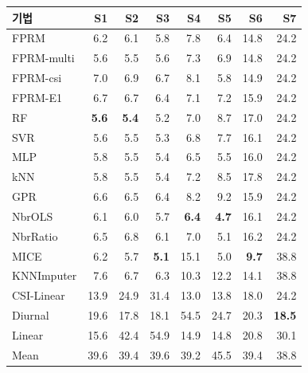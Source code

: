 \begin{tabular}{lrrrrrrr}
\toprule
기법 & S1 & S2 & S3 & S4 & S5 & S6 & S7 \\
\midrule
FPRM & 6.2 & 6.1 & 5.8 & 7.8 & 6.4 & 14.8 & 24.2 \\
FPRM-multi & 5.6 & 5.5 & 5.6 & 7.3 & 6.9 & 14.8 & 24.2 \\
FPRM-csi & 7.0 & 6.9 & 6.7 & 8.1 & 5.8 & 14.9 & 24.2 \\
FPRM-E1 & 6.7 & 6.7 & 6.4 & 7.1 & 7.2 & 15.9 & 24.2 \\
\midrule
RF & \textbf{5.6} & \textbf{5.4} & 5.2 & 7.0 & 8.7 & 17.0 & 24.2 \\
SVR & 5.6 & 5.5 & 5.3 & 6.8 & 7.7 & 16.1 & 24.2 \\
MLP & 5.8 & 5.5 & 5.4 & 6.5 & 5.5 & 16.0 & 24.2 \\
kNN & 5.8 & 5.5 & 5.4 & 7.2 & 8.5 & 17.8 & 24.2 \\
GPR & 6.6 & 6.5 & 6.4 & 8.2 & 9.2 & 15.9 & 24.2 \\
\midrule
NbrOLS & 6.1 & 6.0 & 5.7 & \textbf{6.4} & \textbf{4.7} & 16.1 & 24.2 \\
NbrRatio & 6.5 & 6.8 & 6.1 & 7.0 & 5.1 & 16.2 & 24.2 \\
MICE & 6.2 & 5.7 & \textbf{5.1} & 15.1 & 5.0 & \textbf{9.7} & 38.8 \\
KNNImputer & 7.6 & 6.7 & 6.3 & 10.3 & 12.2 & 14.1 & 38.8 \\
\midrule
CSI-Linear & 13.9 & 24.9 & 31.4 & 13.0 & 13.8 & 18.0 & 24.2 \\
Diurnal & 19.6 & 17.8 & 18.1 & 54.5 & 24.7 & 20.3 & \textbf{18.5} \\
Linear & 15.6 & 42.4 & 54.9 & 14.9 & 14.8 & 20.8 & 30.1 \\
Mean & 39.6 & 39.4 & 39.6 & 39.2 & 45.5 & 39.4 & 38.8 \\
\bottomrule
\end{tabular}
